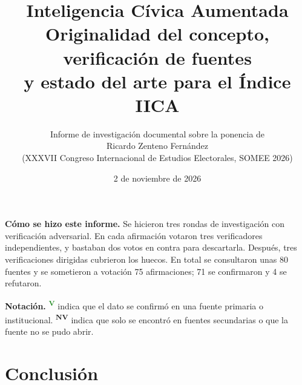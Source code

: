 \documentclass[11pt,a4paper]{article}
\title{\color{acento}\textbf{Inteligencia Cívica Aumentada}\\[0.3em]
\large Originalidad del concepto, verificación de fuentes\\ y estado del arte para el Índice IICA}
\author{Informe de investigación documental sobre la ponencia de\\
Ricardo Zenteno Fernández\\ (XXXVII Congreso Internacional de Estudios Electorales, SOMEE 2026)}
\date{2 de noviembre de 2026}
\newcommand{\ver}{\textsuperscript{\textcolor{ForestGreen}{\textbf{V}}}}
\newcommand{\nover}{\textsuperscript{\textcolor{aviso}{\textbf{NV}}}}
\begin{document}
\maketitle
\thispagestyle{empty}

\begin{resumen}
\textbf{Cómo se hizo este informe.} Se hicieron tres rondas de investigación con verificación adversarial. En cada afirmación votaron tres verificadores independientes, y bastaban dos votos en contra para descartarla. Después, tres verificaciones dirigidas cubrieron los huecos. En total se consultaron unas 80 fuentes y se sometieron a votación 75 afirmaciones; 71 se confirmaron y 4 se refutaron.

\textbf{Notación.} \ver{} indica que el dato se confirmó en una fuente primaria o institucional. \nover{} indica que solo se encontró en fuentes secundarias o que la fuente no se pudo abrir.
\end{resumen}

\tableofcontents
\newpage

\section{Conclusión}
\end{document}
